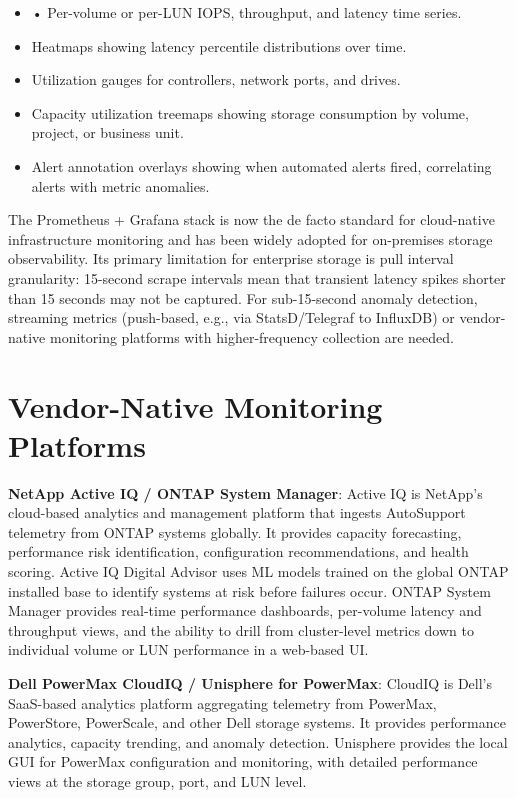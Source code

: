 \begin{itemize}
  \item • Per-volume or per-LUN IOPS, throughput, and latency time series.
  \item Heatmaps showing latency percentile distributions over time.
  \item Utilization gauges for controllers, network ports, and drives.
  \item Capacity utilization treemaps showing storage consumption by volume, project, or business unit.
  \item Alert annotation overlays showing when automated alerts fired, correlating alerts with metric anomalies.
\end{itemize}

The Prometheus + Grafana stack is now the de facto standard for cloud-native infrastructure monitoring and has been widely adopted for on-premises storage observability. Its primary limitation for enterprise storage is pull interval granularity: 15-second scrape intervals mean that transient latency spikes shorter than 15 seconds may not be captured. For sub-15-second anomaly detection, streaming metrics (push-based, e.g., via StatsD/Telegraf to InfluxDB) or vendor-native monitoring platforms with higher-frequency collection are needed.

\section{Vendor-Native Monitoring Platforms}
\textbf{NetApp Active IQ / ONTAP System Manager}: Active IQ is NetApp's cloud-based analytics and management platform that ingests AutoSupport telemetry from ONTAP systems globally. It provides capacity forecasting, performance risk identification, configuration recommendations, and health scoring. Active IQ Digital Advisor uses ML models trained on the global ONTAP installed base to identify systems at risk before failures occur. ONTAP System Manager provides real-time performance dashboards, per-volume latency and throughput views, and the ability to drill from cluster-level metrics down to individual volume or LUN performance in a web-based UI.

\textbf{Dell PowerMax CloudIQ / Unisphere for PowerMax}: CloudIQ is Dell's SaaS-based analytics platform aggregating telemetry from PowerMax, PowerStore, PowerScale, and other Dell storage systems. It provides performance analytics, capacity trending, and anomaly detection. Unisphere provides the local GUI for PowerMax configuration and monitoring, with detailed performance views at the storage group, port, and LUN level.

